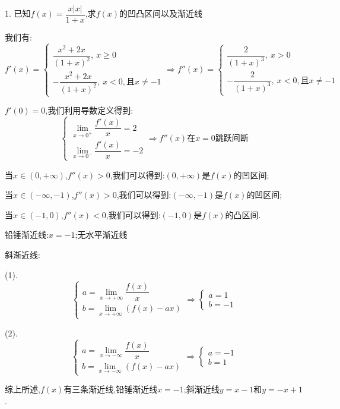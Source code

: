 1. 已知$f(x)=\dfrac{x|x|}{1+x}$,求$f(x)$的凹凸区间以及渐近线
\begin{solution}

	我们有:  
	$$f'(x)=\left\lbrace
	\begin{array}{l}
		\dfrac{x^2+2x}{(1+x)^2},\ x\geq 0\\
		-\dfrac{x^2+2x}{(1+x)^2},\ x<0,\text{且}x\neq -1
	\end{array}
	\right. \Rightarrow f''(x)=\left\lbrace
	\begin{array}{l}
		\dfrac{2}{(1+x)^3},\ x>0\\
		-\dfrac{2}{(1+x)^3},\ x<0,\text{且}x\neq -1
	\end{array}
	\right. $$
	
	$f'(0)=0$,我们利用导数定义得到:  
	$$\left\lbrace
	\begin{array}{l}
		\lim\limits_{x\rightarrow 0^{+}}\dfrac{f'(x)}{x}=2\\
		\lim\limits_{x\rightarrow 0^{-}}\dfrac{f'(x)}{x}=-2
	\end{array}
	\right. \Rightarrow f''(x)\text{在}x=0\text{跳跃间断}$$
	
	当$x\in(0,+\infty)$,$f''(x)>0$,我们可以得到:$(0,+\infty)$是$f(x)$的凹区间;
	
	当$x\in(-\infty,-1)$,$f''(x)>0$,我们可以得到:$(-\infty,-1)$是$f(x)$的凹区间;
	
	当$x\in(-1,0)$,$f''(x)<0$,我们可以得到:$(-1,0)$是$f(x)$的凸区间.
	
	铅锤渐近线:$x=-1$;无水平渐近线
	
	斜渐近线:  
	
	(1).
	$$\left\lbrace
	\begin{array}{l}
		a=\lim\limits_{x\rightarrow+\infty}\dfrac{f(x)}{x}\\
		b=\lim\limits_{x\rightarrow+\infty}(f(x)-ax)
	\end{array}
	\right. \Rightarrow\left\lbrace
	\begin{array}{l}
		a=1\\
		b=-1
	\end{array}
	\right. $$
	
	(2).
	$$\left\lbrace
	\begin{array}{l}
		a=\lim\limits_{x\rightarrow-\infty}\dfrac{f(x)}{x}\\
		b=\lim\limits_{x\rightarrow-\infty}(f(x)-ax)
	\end{array}
	\right. \Rightarrow\left\lbrace
	\begin{array}{l}
		a=-1\\
		b=1
	\end{array}
	\right. $$
	
	综上所述,$f(x)$有三条渐近线,铅锤渐近线$x=-1$;斜渐近线$y=x-1$和$y=-x+1$.
\end{solution}

